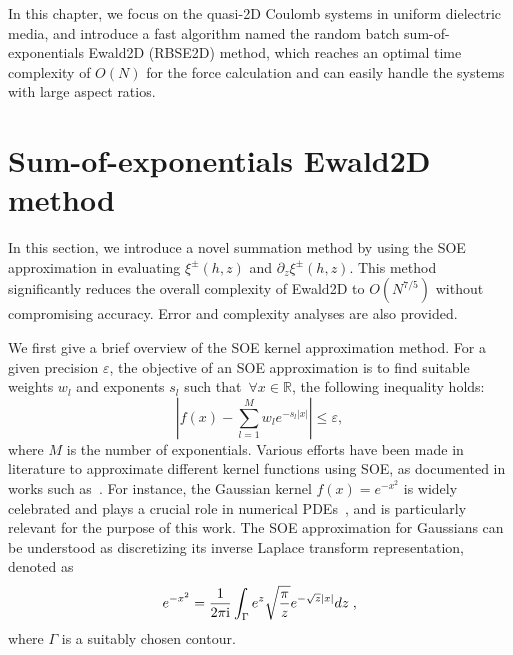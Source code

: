In this chapter, we focus on the quasi-2D Coulomb systems in uniform dielectric media, and introduce a fast algorithm named the random batch sum-of-exponentials Ewald2D (RBSE2D) method, which reaches an optimal time complexity of $O(N)$ for the force calculation and can easily handle the systems with large aspect ratios.

\section{Sum-of-exponentials Ewald2D method} \label{sec:method}

In this section, we introduce a novel summation method by using the SOE approximation in evaluating $\xi^{\pm}(h,z)$ and $\partial_{z}\xi^{\pm}(h,z)$. 
This method significantly reduces the overall complexity of Ewald2D to $O(N^{7/5})$ without compromising accuracy. 
Error and complexity analyses are also provided.

We first give a brief overview of the SOE kernel approximation method.  
For a given precision $\varepsilon$, the objective of an SOE approximation is to find suitable weights $w_l$ and exponents $s_l$ such that~$\forall x \in \mathbb{R}$, the following inequality holds:
\begin{equation}\label{eq::SOE1}
	\left|f(x)-\sum_{l=1}^M w_l e^{-s_l|x|}\right|\leq \varepsilon,
\end{equation}
where $M$ is the number of exponentials. 
Various efforts have been made in literature to approximate different kernel functions using SOE, as documented in works such as~\cite{wiscombe1977exponential, evans1980least, jiang2008efficient, beylkin2005approximation, beylkin2010approximation}.
For instance, the Gaussian kernel $f(x)=e^{-x^2}$ is widely celebrated and plays a crucial role in numerical PDEs~\cite{weideman2010improved,wang2018adaptive}, and is particularly relevant for the purpose of this work. 
The SOE approximation for Gaussians can be understood as discretizing its inverse Laplace transform representation, denoted as
\begin{equation}\label{eq:inverse_laplace}
	e^{-x^2} = \frac{1}{2 \pi \mathrm{i}} \int_{\Gamma} e^{z} \sqrt{\frac{\pi}{z}} e^{-\sqrt{z}\lvert x\rvert} dz\;,
\end{equation}
where $\Gamma$ is a suitably chosen contour. 

